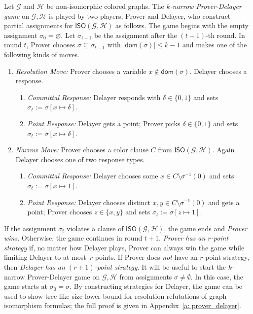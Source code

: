 \documentclass[10pt,a4paper]{article}
\newcommand{\defining}[1]{\emph{#1}}
\newcommand{\graphG}{\mathcal{G}}
\newcommand{\graphH}{\mathcal{H}}
\newcommand{\dom}{\mathsf{dom}}
\newcommand{\ISO}{\mathsf{ISO}(\graphG, \graphH)}
\newcommand{\ifAppendix}[1]{#1}
\begin{document}
Let $\graphG$ and $\graphH$ be non-isomorphic colored graphs.
The \defining{$k$-narrow Prover-Delayer game} on $\graphG, \graphH$ is played 
by two players, Prover and Delayer, who construct  partial assignments for $\ISO$ as follows. The game begins with the empty assignment $\sigma_0 = 
\varnothing$.
Let $\sigma_{t-1}$ be the assignment after the $(t-1)$-th round.
In round $t$, Prover chooses $\sigma \subseteq \sigma_{t-1}$ with $|\dom(\sigma)| \le k-1$ and makes one of the following kinds of moves.
\begin{enumerate}
\item \defining{Resolution Move:} Prover chooses a variable $x \not \in \dom(\sigma)$. Delayer chooses a response. 
\begin{enumerate}
\item \defining{Committal Response:} Delayer responds with $\delta \in \{0,1\}$ and sets $\sigma_t := \sigma [x \mapsto \delta ]$.
\item  \defining{Point Response:} Delayer gets a point; Prover picks $\delta \in \{0,1\}$ and sets $\sigma_t := \sigma [x \mapsto \delta ]$.
\end{enumerate}
\item  \defining{Narrow Move:} Prover chooses a color clause $C$ from $\ISO$. Again Delayer chooses one of two response types.
\begin{enumerate}
\item \defining{Committal Response:} Delayer chooses some $x \in C \setminus \sigma^{-1}(0)$ and sets $\sigma_t := \sigma [ x \mapsto 1 ]$.
\item  \defining{Point Response:} Delayer chooses distinct $x,y \in C \setminus \sigma^{-1}(0)$ and gets a point; Prover chooses $z \in \{x,y\}$ and sets $\sigma_t := \sigma [z \mapsto1 ]$. 
\end{enumerate}
\end{enumerate} 
\noindent If the assignment $\sigma_t$ violates a clause of $\ISO$,
the game ends and \defining{Prover wins}.  Otherwise, the game continues in round $t+1$. \defining{Prover has an $r$-point strategy} if, no matter how Delayer plays, Prover can always win the game while limiting Delayer to at most~$r$ points. If Prover does \emph{not} have an $r$-point strategy, then \defining{Delayer has an $(r+1)$-point strategy}.
It will be useful to start the $k$-narrow Prover-Delayer game on $\graphG, \graphH$ from assignments $\sigma \neq \emptyset$. In this case, the game starts at $\sigma_0 = \sigma$.
%
By constructing strategies for Delayer, the game can be used to show tree-like size lower bound for resolution refutations of graph isomorphism formulas\ifAppendix{; the full proof is given in Appendix~\ref{a: prover_delayer}}.
\end{document}
